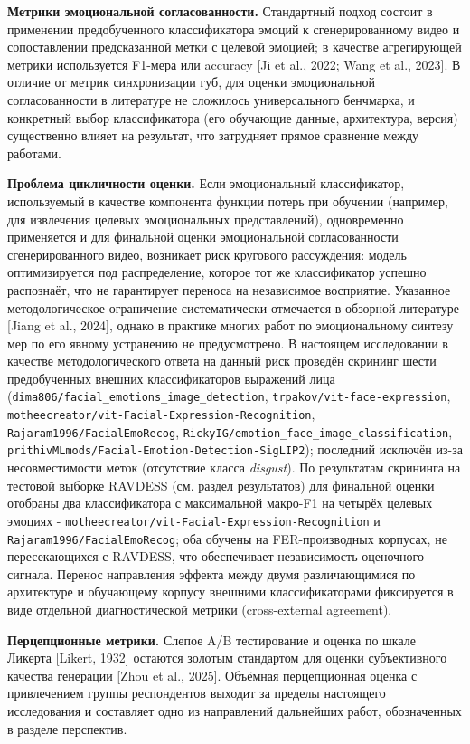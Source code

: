 \documentclass[a4paper, 12pt, oneside, openany]{article}
\begin{document}
\textbf{Метрики эмоциональной согласованности.} Стандартный подход состоит в применении предобученного классификатора эмоций к сгенерированному видео и сопоставлении предсказанной метки с целевой эмоцией; в качестве агрегирующей метрики используется F1-мера или accuracy [Ji et al., 2022; Wang et al., 2023]. В отличие от метрик синхронизации губ, для оценки эмоциональной согласованности в литературе не сложилось универсального бенчмарка, и конкретный выбор классификатора (его обучающие данные, архитектура, версия) существенно влияет на результат, что затрудняет прямое сравнение между работами.

\textbf{Проблема цикличности оценки.} Если эмоциональный классификатор, используемый в качестве компонента функции потерь при обучении (например, для извлечения целевых эмоциональных представлений), одновременно применяется и для финальной оценки эмоциональной согласованности сгенерированного видео, возникает риск кругового рассуждения: модель оптимизируется под распределение, которое тот же классификатор успешно распознаёт, что не гарантирует переноса на независимое восприятие. Указанное методологическое ограничение систематически отмечается в обзорной литературе [Jiang et al., 2024], однако в практике многих работ по эмоциональному синтезу мер по его явному устранению не предусмотрено. В настоящем исследовании в качестве методологического ответа на данный риск проведён скрининг шести предобученных внешних классификаторов выражений лица (\texttt{dima806/facial\_emotions\_image\_detection}, \texttt{trpakov/vit-face-expression}, \texttt{motheecreator/vit-Facial-Expression-Recognition}, \texttt{Rajaram1996/FacialEmoRecog}, \texttt{RickyIG/emotion\_face\_image\_classification}, \texttt{prithivMLmods/Facial-Emotion-Detection-SigLIP2}); последний исключён из-за несовместимости меток (отсутствие класса \textit{disgust}). По результатам скрининга на тестовой выборке RAVDESS (см. раздел результатов) для финальной оценки отобраны два классификатора с максимальной макро-F1 на четырёх целевых эмоциях - \texttt{motheecreator/vit-Facial-Expression-Recognition} и \texttt{Rajaram1996/FacialEmoRecog}; оба обучены на FER-производных корпусах, не пересекающихся с RAVDESS, что обеспечивает независимость оценочного сигнала. Перенос направления эффекта между двумя различающимися по архитектуре и обучающему корпусу внешними классификаторами фиксируется в виде отдельной диагностической метрики (cross-external agreement).

\textbf{Перцепционные метрики.} Слепое A/B тестирование и оценка по шкале Ликерта [Likert, 1932] остаются золотым стандартом для оценки субъективного качества генерации [Zhou et al., 2025]. Объёмная перцепционная оценка с привлечением группы респондентов выходит за пределы настоящего исследования и составляет одно из направлений дальнейших работ, обозначенных в разделе перспектив.
\end{document}
